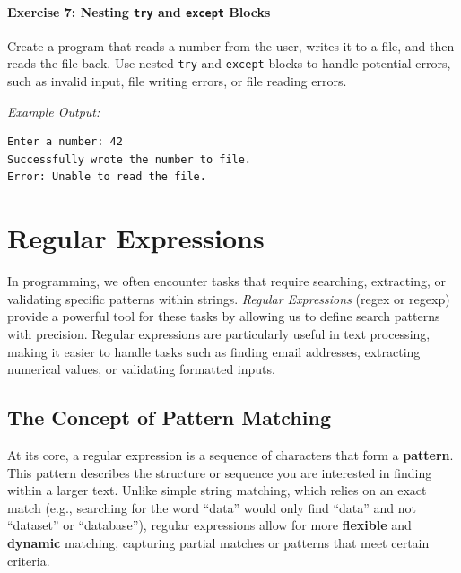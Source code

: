 \documentclass[
  letterpaper,
  DIV=11,
  numbers=noendperiod]{scrreprt}
\begin{document}
\hypertarget{exercise-7-nesting-try-and-except-blocks}{%
\subsubsection{\texorpdfstring{Exercise 7: Nesting \texttt{try} and
\texttt{except}
Blocks}{Exercise 7: Nesting try and except Blocks}}\label{exercise-7-nesting-try-and-except-blocks}}

Create a program that reads a number from the user, writes it to a file,
and then reads the file back. Use nested \texttt{try} and
\texttt{except} blocks to handle potential errors, such as invalid
input, file writing errors, or file reading errors.

\emph{Example Output:}

\begin{verbatim}
Enter a number: 42
Successfully wrote the number to file.
Error: Unable to read the file.
\end{verbatim}


\hypertarget{sec-regex}{%
\chapter{Regular Expressions}\label{sec-regex}}

In programming, we often encounter tasks that require searching,
extracting, or validating specific patterns within strings.
\emph{Regular Expressions} (regex or regexp) provide a powerful tool for
these tasks by allowing us to define search patterns with precision.
Regular expressions are particularly useful in text processing, making
it easier to handle tasks such as finding email addresses, extracting
numerical values, or validating formatted inputs.

\hypertarget{the-concept-of-pattern-matching}{%
\section{The Concept of Pattern
Matching}\label{the-concept-of-pattern-matching}}

At its core, a regular expression is a sequence of characters that form
a \textbf{pattern}. This pattern describes the structure or sequence you
are interested in finding within a larger text. Unlike simple string
matching, which relies on an exact match (e.g., searching for the word
``data'' would only find ``data'' and not ``dataset'' or ``database''),
regular expressions allow for more \textbf{flexible} and
\textbf{dynamic} matching, capturing partial matches or patterns that
meet certain criteria.
\end{document}
